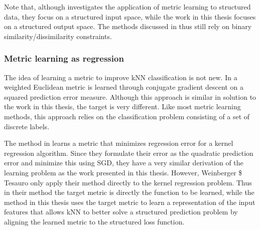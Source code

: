 Note that, although \cite{bellet2013survey} investigates the application of metric learning to structured data, they focus on a structured input space, while the work in this thesis focuses on a structured output space. The methods discussed in \cite{bellet2013survey} thus still rely on binary similarity/dissimilarity constraints.

\subsubsection{Metric learning as regression}

The idea of learning a metric to improve \ac{kNN} classification is not new. In \cite{lowe1995similarity} a weighted Euclidean metric is learned through conjugate gradient descent on a squared prediction error measure. Although this approach is similar in solution to the work in this thesis, the target is very different. Like most metric learning methods, this approach relies on the classification problem consisting of a set of discrete labels.

The method in \cite{weinberger2007metric} learns a metric that minimizes regression error for a kernel regression algorithm. Since they formulate their error as the quadratic prediction error and minimize this using \ac{SGD}, they have a very similar derivation of the learning problem as the work presented in this thesis. However, Weinberger \$ Tesauro only apply their method directly to the kernel regression problem. Thus in their method the target metric is directly the function to be learned, while the method in this thesis uses the target metric to learn a representation of the input features that allows \ac{kNN} to better solve a structured prediction problem by aligning the learned metric to the structured loss function.

